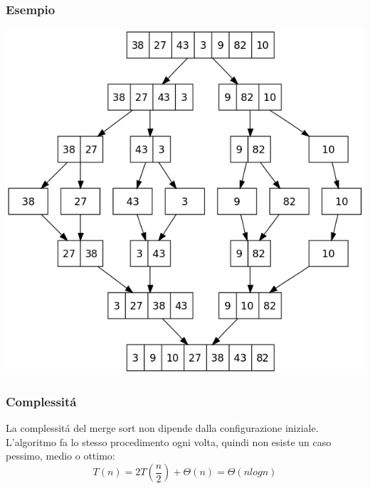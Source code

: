 \documentclass{article}
\begin{document}
\subsubsection{Esempio}
\includegraphics[scale=0.4]{merge-sort.png}

\subsubsection{Complessitá}
La complessitá del merge sort non dipende dalla configurazione iniziale. L'algoritmo fa lo stesso procedimento ogni volta, quindi non esiste un caso pessimo, medio o ottimo:\\
$$T(n) = 2T(\frac{n}{2}) + \Theta(n) = \Theta(nlogn)$$
\end{document}
